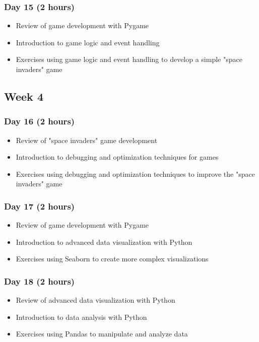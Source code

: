 \documentclass[11pt]{article}
\begin{document}
\subsubsection*{Day 15 (2 hours)}
\label{sec:org44b0142}

\begin{itemize}
\item Review of game development with Pygame
\item Introduction to game logic and event handling
\item Exercises using game logic and event handling to develop a simple "space invaders" game
\end{itemize}
\subsection*{Week 4}
\label{sec:org7b7d913}
\subsubsection*{Day 16 (2 hours)}
\label{sec:org37337bd}

\begin{itemize}
\item Review of "space invaders" game development
\item Introduction to debugging and optimization techniques for games
\item Exercises using debugging and optimization techniques to improve the
"space invaders" game
\end{itemize}
\subsubsection*{Day 17 (2 hours)}
\label{sec:org5f171d6}

\begin{itemize}
\item Review of game development with Pygame
\item Introduction to advanced data visualization with Python
\item Exercises using Seaborn to create more complex visualizations
\end{itemize}
\subsubsection*{Day 18 (2 hours)}
\label{sec:org106ba35}

\begin{itemize}
\item Review of advanced data visualization with Python
\item Introduction to data analysis with Python
\item Exercises using Pandas to manipulate and analyze data
\end{itemize}
\end{document}
